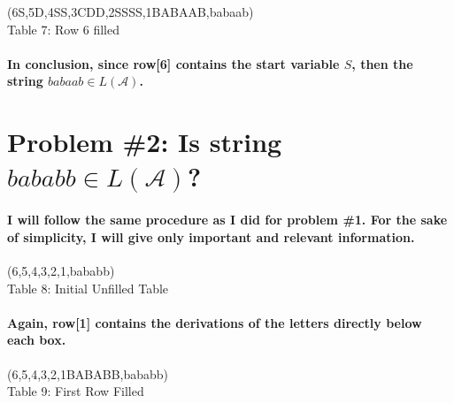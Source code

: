 \documentclass[12pt]{article}
\begin{document}
\begin{center}
    \young(6S,5D\emptyset,4S\emptyset S,3CDD\emptyset,2SSS\emptyset S,1BABAAB,\hfill babaab) \\
    Table 7: Row 6 filled
\end{center}

\paragraph{In conclusion, since row[6] contains the start variable $S$, then the string $babaab \in L(\mathcal{A})$.}
\clearpage

\section*{Problem \#2: Is string $bababb \in L(\mathcal{A})$?}
\paragraph{I will follow the same procedure as I did for problem \#1. For the sake of simplicity, I will give only important and relevant information.}

\begin{center}
    \young(6\hfill,5\hfill \hfill,4\hfill \hfill \hfill,3\hfill \hfill \hfill \hfill,2\hfill \hfill \hfill \hfill \hfill,1\hfill \hfill \hfill \hfill \hfill \hfill,\hfill bababb) \\
    Table 8: Initial Unfilled Table
\end{center}

\paragraph{Again, row[1] contains the derivations of the letters directly below each box.}
\begin{center}
    \young(6\hfill,5\hfill \hfill,4\hfill \hfill \hfill,3\hfill \hfill \hfill \hfill,2\hfill \hfill \hfill \hfill \hfill,1BABABB,\hfill bababb) \\
    Table 9: First Row Filled
\end{center}
\end{document}
